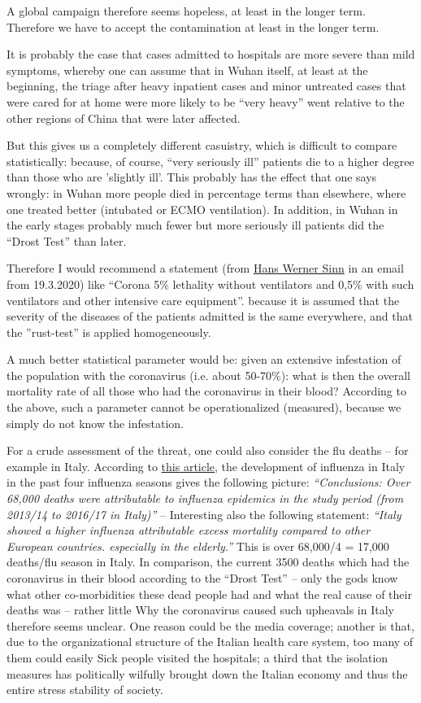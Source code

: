\documentclass[%
 reprint,
 showpacs,
 showkeys,
 preprintnumbers,
 amsmath,amssymb,
 aps,
  pra,
  longbibliography,
 floatfix,
 ]{revtex4-1}
\begin{document}
A global campaign therefore seems hopeless, at least in the longer term. Therefore we have to accept the contamination at least in the longer term.


It is probably the case that cases admitted to hospitals are more severe than mild symptoms,
whereby one can assume that in Wuhan itself, at least at the beginning, the triage after heavy
inpatient cases and minor untreated cases that were cared for at home were more likely to be
``very heavy'' went relative to the other regions of China that were later affected.

But this gives us a completely different casuistry, which is difficult to compare statistically:
because, of course, ``very seriously ill'' patients die to a higher degree than those who are 'slightly ill'.
This probably has the effect that one says wrongly: in Wuhan more people died in percentage terms than elsewhere,
where one treated better (intubated or ECMO ventilation).
In addition, in Wuhan in the early stages probably much fewer but more seriously ill patients did the ``Drost Test'' than later.

Therefore I would recommend a statement (from \href{https://youtu.be/Qac5Kk1dKqU}{Hans Werner Sinn} in an email from 19.3.2020) like ``Corona 5\% lethality without ventilators and 0,5\% with such ventilators and other intensive care equipment''.
because it is assumed that the severity of the diseases of the patients admitted is the same everywhere,
and that the ''rust-test'' is applied homogeneously.


A much better statistical parameter would be: given an extensive infestation of the population with the coronavirus (i.e. about 50-70\%):
what is then the overall mortality rate of all those who had the coronavirus in their blood?
According to the above, such a parameter cannot be operationalized (measured), because we simply do not know the infestation.

For a crude assessment of the threat, one could also consider the flu deaths -- for example in Italy.
According to \href{https://doi.org/10.1016/j.ijid.2019.08.003}{this article}, the development of influenza in Italy in the past four influenza seasons gives the following picture:
{\em ``Conclusions: Over 68,000 deaths were attributable to influenza epidemics in the study period (from 2013/14 to 2016/17 in Italy)''} --
Interesting also the following statement: {\em ``Italy showed a higher influenza attributable excess mortality compared to other European countries.
especially in the elderly.''}
This is over 68,000/4 = 17,000 deaths/flu season in Italy.
In comparison, the current 3500 deaths which had the coronavirus in their blood according to the ``Drost Test'' --
only the gods know what other co-morbidities these dead people had and what the real cause of their deaths was -- rather little
Why the coronavirus caused such upheavals in Italy therefore seems unclear.
 One reason could be the media coverage;
another is that, due to the organizational structure of the Italian health care system, too many of them could easily
Sick people visited the hospitals;
a third that the isolation measures
has politically wilfully brought down the Italian economy and thus the entire stress stability of society.
\end{document}
